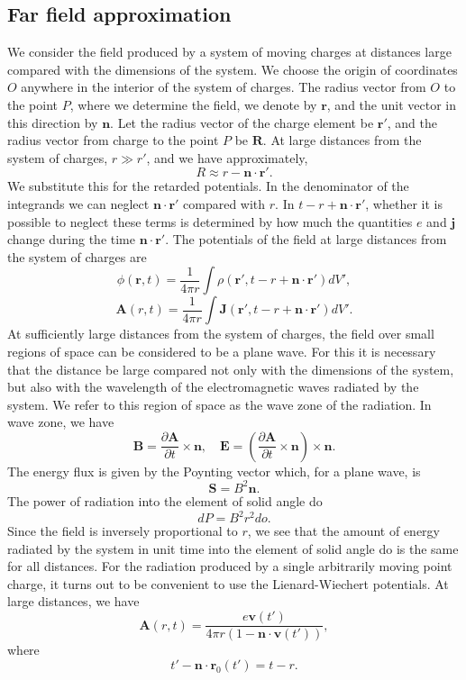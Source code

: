 \subsection{Far field approximation}
We consider the field produced by a system of moving charges at distances large compared with the dimensions of the system. We choose the origin of coordinates $O$ anywhere in the interior of the system of charges. The radius vector from $O$ to the point $P$, where we determine the field, we denote by $\bm{r}$, and the unit vector in this direction by $\bm{n}$. Let the radius vector of the charge element be $\bm{r}'$, and the radius vector from charge to the point $P$ be $\bm{R}$. At large distances from the system of charges, $r \gg r'$, and we have approximately,
\[R \approx r - \bm{n}\cdot\bm{r}'.\]
We substitute this for the retarded potentials. In the denominator of the integrands we can neglect $\bm{n}\cdot\bm{r}'$ compared with $r$. In $t-r + \bm{n}\cdot\bm{r}'$, whether it is possible to neglect these terms is determined by how much the quantities $e$ and $\bm{j}$ change during the time $\bm{n}\cdot\bm{r}'$. 
The potentials of the field at large distances from the system of charges are
\[\phi(\bm{r},t) = \frac{1}{4\pi r} \int \rho(\bm{r}',t-r+\bm{n}\cdot\bm{r}') dV',\]
\[\bm{A}(r,t) = \frac{1}{4\pi r} \int \bm{J}(\bm{r}',t-r+\bm{n}\cdot\bm{r}') dV'.\]
At sufficiently large distances from the system of charges, the field over small regions of space can be considered to be a plane wave. 
For this it is necessary that the distance be large
compared not only with the dimensions of the system, but also with the wavelength of the electromagnetic waves radiated by the system. 
We refer to this region of space as the wave
zone of the radiation.
In wave zone, we have
\[\bm{B} = \frac{\partial \bm{A}}{\partial t} \times \bm{n} , \quad \bm{E} = \left(\frac{\partial \bm{A}}{\partial t} \times \bm{n}\right) \times \bm{n}.\]
The energy flux is given by the Poynting vector which, for a plane wave, is
\[\bm{S} = B^2\bm{n}.\]
The power of radiation into the element of solid angle do
\[dP = B^2r^2 do.\]
Since the field is inversely proportional to $r$, we see that the amount of energy radiated by the system in unit time into the element of solid angle do is the same for all distances.
For the radiation produced by a single arbitrarily moving point charge, it turns out to be convenient to use the Lienard-Wiechert potentials. At large distances, we have
\[\bm{A}(r,t) = \frac{e\bm{v}(t')}{4\pi r (1 - \bm{n}\cdot\bm{v}(t'))},\]
where
\[ t'-\bm{n}\cdot\bm{r}_0(t') = t - r.\]
